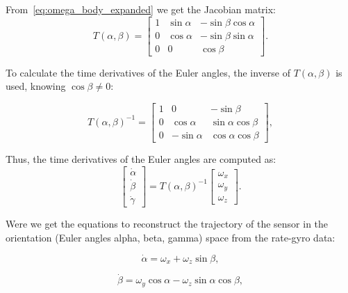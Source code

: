 \documentclass[12pt]{article}
\begin{document}
From~\ref{eq:omega_body_expanded} we get the Jacobian matrix:
\begin{equation}
\label{eq:jacobian_matrix}
T(\alpha, \beta) =
\begin{bmatrix}
1 & \sin\alpha & -\sin\beta \cos\alpha \\
0 & \cos\alpha & -\sin\beta \sin\alpha \\
0 & 0 & \cos\beta
\end{bmatrix}.
\end{equation}

To calculate the time derivatives of the Euler angles, the inverse of \(T(\alpha, \beta)\) is used, knowing \(\cos\beta \neq 0\):

\begin{equation}
T(\alpha, \beta)^{-1} =
\begin{bmatrix}
\label{eq:jacobian_inverse}
1 & 0 & -\sin\beta \\
0 & \cos\alpha & \sin\alpha \cos\beta \\
0 & -\sin\alpha & \cos\alpha \cos\beta
\end{bmatrix},
\end{equation}


Thus, the time derivatives of the Euler angles are computed as:
\begin{equation}
\begin{bmatrix}
\label{eq:euler_derivatives}
\dot{\alpha} \\
\dot{\beta} \\
\dot{\gamma}
\end{bmatrix}
=
T(\alpha, \beta)^{-1}
\begin{bmatrix}
\omega_x \\
\omega_y \\
\omega_z
\end{bmatrix}.  
\end{equation}


Were we get the equations to reconstruct the trajectory of the sensor in the orientation
(Euler angles alpha, beta, gamma) space from the rate-gyro data:

\begin{equation}
\label{eq:alpha}
\dot{\alpha} = \omega_x + \omega_z \sin\beta,
\end{equation}


\begin{equation}
\label{eq:beta}
\dot{\beta} = \omega_y \cos\alpha - \omega_z \sin\alpha \cos\beta,  
\end{equation}
\end{document}
